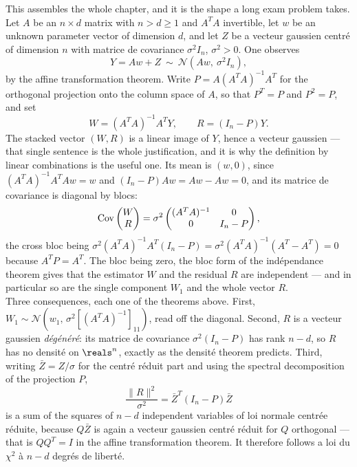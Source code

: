 \begin{example}
This assembles the whole chapter, and it is the shape a long exam problem takes.\\

Let $A$ be an $n \times d$ matrix with $n > d \geq 1$ and $A^{T}A$ invertible,
let $w$ be an unknown parameter vector of dimension $d$, and let $Z$ be a vecteur
gaussien centré of dimension $n$ with matrice de covariance $\sigma^{2}I_{n}$,
$\sigma^{2} > 0$. One observes
\[
  Y = Aw + Z \ \sim\ \mathcal{N}\!\left(Aw,\ \sigma^{2}I_{n}\right) ,
\]
by the affine transformation theorem. Write $P = A(A^{T}A)^{-1}A^{T}$ for the
orthogonal projection onto the column space of $A$, so that $P^{T} = P$ and
$P^{2} = P$, and set
\[
  W = (A^{T}A)^{-1}A^{T}Y, \qquad R = (I_{n} - P)Y .
\]
The stacked vector $(W,R)$ is a linear image of $Y$, hence a vecteur gaussien ---
that single sentence is the whole justification, and it is why the definition by
linear combinations is the useful one. Its mean is $(w, 0)$, since
$(A^{T}A)^{-1}A^{T}Aw = w$ and $(I_{n}-P)Aw = Aw - Aw = 0$, and its matrice de
covariance is diagonal by blocs:
\[
  \operatorname{Cov}\begin{pmatrix} W \\ R \end{pmatrix}
    = \sigma^{2}\begin{pmatrix} (A^{T}A)^{-1} & 0 \\ 0 & I_{n} - P \end{pmatrix} ,
\]
the cross bloc being
$\sigma^{2}(A^{T}A)^{-1}A^{T}(I_{n}-P) = \sigma^{2}(A^{T}A)^{-1}(A^{T} - A^{T}) = 0$
because $A^{T}P = A^{T}$. The bloc being zero, the bloc form of the
indépendance theorem gives that the estimator $W$ and the residual $R$ are
independent --- and in particular
so are the single component $W_{1}$ and the whole vector $R$.\\

Three consequences, each one of the theorems above. First,
$W_{1} \sim \mathcal{N}\!\left(w_{1},\, \sigma^{2}[(A^{T}A)^{-1}]_{11}\right)$,
read off the diagonal. Second, $R$ is a vecteur gaussien \emph{dégénéré}: its
matrice de covariance $\sigma^{2}(I_{n}-P)$ has rank $n-d$, so $R$ has no densité
on $\reals^{n}$, exactly as the densité theorem predicts. Third, writing
$\bar{Z} = Z/\sigma$ for the centré réduit part and using the spectral
decomposition of the projection $P$,
\[
  \frac{\|R\|^{2}}{\sigma^{2}} = \bar{Z}^{T}(I_{n}-P)\bar{Z}
\]
is a sum of the squares of $n-d$ independent variables of loi normale centrée
réduite, because $Q\bar{Z}$ is again a vecteur gaussien centré réduit for $Q$
orthogonal --- that is $QQ^{T} = I$ in the affine transformation theorem. It
therefore follows a loi du $\chi^{2}$ à $n-d$ degrés de liberté.\\


\end{example}
